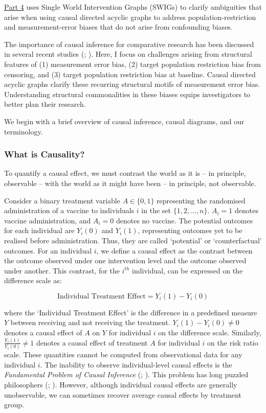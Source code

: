 \documentclass[
  single column]{article}
\begin{document}
\hyperref[id-sec-4]{Part 4} uses Single World Intervention Graphs
(SWIGs) to clarify ambiguities that arise when using causal directed
acyclic graphs to address population-restriction and measurement-error
biases that do not arise from confounding biases.

The importance of causal inference for comparative research has been
discussed in several recent studies
(;
). Here, I focus
on challenges arising from structural features of (1) measurement error
bias, (2) target population restriction bias from censoring, and (3)
target population restriction bias at baseline. Causal directed acyclic
graphs clarify these recurring structural motifs of measurement error
bias. Understanding structural commonalities in these biases equips
investigators to better plan their research.

We begin with a brief overview of causal inference, causal diagrams, and
our terminology.

\subsubsection{What is Causality?}\label{what-is-causality}

To quantify a causal effect, we must contrast the world as it is -- in
principle, observable -- with the world as it might have been -- in
principle, not observable.

Consider a binary treatment variable \(A \in \{0,1\}\) representing the
randomised administration of a vaccine to individuals \(i\) in the set
\(\{1, 2, \ldots, n\}\). \(A_i = 1\) denotes vaccine administration, and
\(A_i = 0\) denotes no vaccine. The potential outcomes for each
individual are \(Y_i(0)\) and \(Y_i(1)\), representing outcomes yet to
be realised before administration. Thus, they are called `potential' or
`counterfactual' outcomes. For an individual \(i\), we define a causal
effect as the contrast between the outcome observed under one
intervention level and the outcome observed under another. This
contrast, for the \(i^{th}\) individual, can be expressed on the
difference scale as:

\[
\text{Individual Treatment Effect} = Y_i(1) - Y_i(0)
\]

where the `Individual Treatment Effect' is the difference in a
predefined measure \(Y\) between receiving and not receiving the
treatment. \(Y_i(1) - Y_i(0) \neq 0\) denotes a causal effect of \(A\)
on \(Y\) for individual \(i\) on the difference scale. Similarly,
\(\frac{Y_i(1)}{Y_i(0)} \neq 1\) denotes a causal effect of treatment
\(A\) for individual \(i\) on the risk ratio scale. These quantities
cannot be computed from observational data for any individual \(i\). The
inability to observe individual-level causal effects is the
\emph{Fundamental Problem of Causal Inference}
(;
). This problem has long puzzled
philosophers (;
). However, although individual
causal effects are generally unobservable, we can sometimes recover
average causal effects by treatment group.
\end{document}
